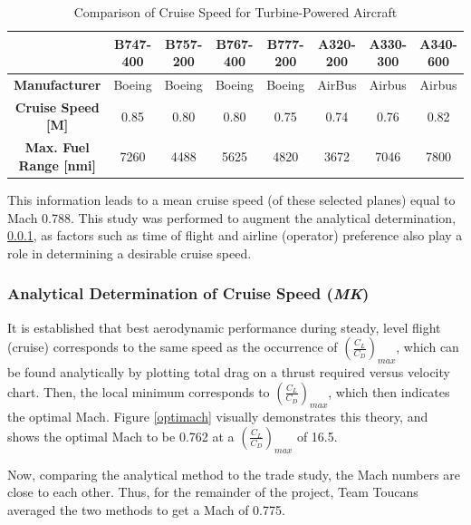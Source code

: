 \begin{table}[!h]
    \centering
        \caption{Comparison of Cruise Speed for Turbine-Powered Aircraft}
    \begin{tabular}{|c||c|c|c|c|c|c|c|}\toprule
         & \textbf{B747-400} & \textbf{B757-200} & \textbf{B767-400} & \textbf{B777-200} & \textbf{A320-200} & \textbf{A330-300} & \textbf{A340-600} \\\hline \hline
         \textbf{Manufacturer} & Boeing & Boeing & Boeing & Boeing & AirBus & Airbus & Airbus\\ \hline
         \textbf{Cruise Speed [M]} & 0.85 & 0.80 & 0.80 & 0.75 & 0.74 & 0.76 & 0.82\\ \hline
         \textbf{Max. Fuel Range [nmi]} & 7260 & 4488 & 5625 & 4820 & 3672 & 7046 & 7800 \\ \bottomrule
    \end{tabular}
    \label{tab:cruisecomp}
\end{table}

This information leads to a mean cruise speed (of these selected planes) equal to Mach 0.788.  This study was performed to augment the analytical determination, \ref{cruisespeed}, as factors such as time of flight and airline (operator) preference also play a role in determining a desirable cruise speed.

\subsubsection{Analytical Determination of Cruise Speed (\textit{MK})} \label{cruisespeed}
It is established that best aerodynamic performance during steady, level flight (cruise) corresponds to the same speed as the occurrence of $(\frac{C_{L}}{C_{D}})_{max}$, which can be found analytically by plotting total drag on a thrust required versus velocity chart. Then, the local minimum corresponds to $(\frac{C_{L}}{C_{D}})_{max}$, which then indicates the optimal Mach. Figure \ref{optimach} visually demonstrates this theory, and shows the optimal Mach to be 0.762 at a $(\frac{C_{L}}{C_{D}})_{max}$ of 16.5. 

Now, comparing the analytical method to the trade study, the Mach numbers are close to each other. Thus, for the remainder of the project, Team Toucans averaged the two methods to get a Mach of 0.775.

